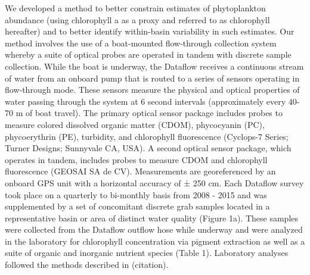 \documentclass[review]{elsarticle}
\begin{document}
We developed a method to better constrain estimates of phytoplankton abundance (using chlorophyll a as a proxy and referred to as chlorophyll hereafter) and to better identify within-basin variability in such estimates. Our method involves the use of a boat-mounted flow-through collection system \citep[Dataflow;][]{madden1992instrument} whereby a suite of optical probes are operated in tandem with discrete sample collection. While the boat is underway, the Dataflow receives a continuous stream of water from an onboard pump that is routed to a series of sensors operating in flow-through mode. These sensors measure the physical and optical properties of water passing through the system at 6 second intervals (approximately every 40-70 m of boat travel). The primary optical sensor package includes probes to measure  colored dissolved organic matter (CDOM), phycocyanin (PC), phycoerythrin (PE), turbidity, and chlorophyll fluorescence (Cyclops-7 Series; Turner Designs; Sunnyvale CA, USA). A second optical sensor package, which operates in tandem, includes probes to measure CDOM and chlorophyll fluorescence (GEOSAI SA de CV). Measurements are georeferenced by an onboard GPS unit with a horizontal accuracy of ± 250 cm. Each Dataflow survey took place on a quarterly to bi-monthly basis from 2008 - 2015 and was supplemented by a set of concomitant discrete grab samples located in a representative basin or area of distinct water quality (Figure 1a). These samples were collected from the Dataflow outflow hose while underway and were analyzed in the laboratory for chlorophyll concentration via pigment extraction as well as a suite of organic and inorganic nutrient species (Table 1). Laboratory analyses followed the methods described in (citation).
\end{document}
